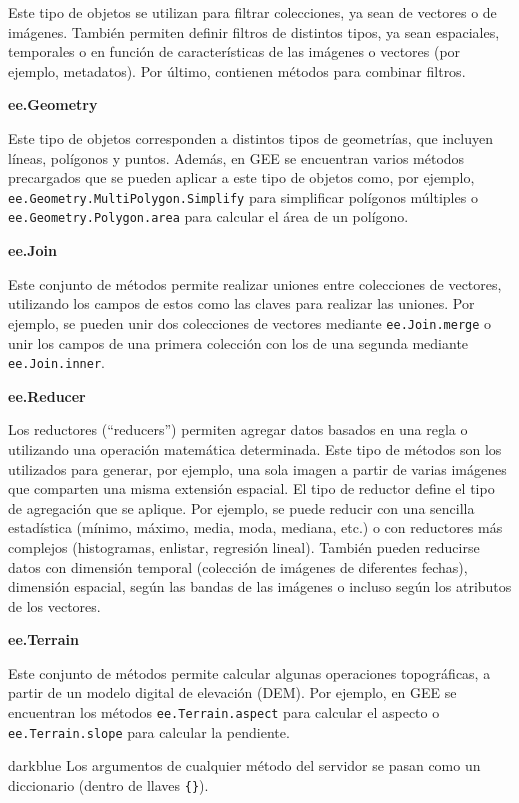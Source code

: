 \documentclass[
  12pt,
  letterpaper,
  twoside]{book}
\begin{document}
Este tipo de objetos se utilizan para filtrar colecciones, ya sean de vectores o de imágenes. También permiten definir filtros de distintos tipos, ya sean espaciales, temporales o en función de características de las imágenes o vectores (por ejemplo, metadatos). Por último, contienen métodos para combinar filtros.

\textbf{ee.Geometry}

Este tipo de objetos corresponden a distintos tipos de geometrías, que incluyen líneas, polígonos y puntos. Además, en GEE se encuentran varios métodos precargados que se pueden aplicar a este tipo de objetos como, por ejemplo, \texttt{ee.Geometry.MultiPolygon.Simplify} para simplificar polígonos múltiples o \texttt{ee.Geometry.Polygon.area} para calcular el área de un polígono.

\textbf{ee.Join}

Este conjunto de métodos permite realizar uniones entre colecciones de vectores, utilizando los campos de estos como las claves para realizar las uniones. Por ejemplo, se pueden unir dos colecciones de vectores mediante \texttt{ee.Join.merge} o unir los campos de una primera colección con los de una segunda mediante \texttt{ee.Join.inner}.

\textbf{ee.Reducer}

Los reductores (``reducers'') permiten agregar datos basados en una regla o utilizando una operación matemática determinada. Este tipo de métodos son los utilizados para generar, por ejemplo, una sola imagen a partir de varias imágenes que comparten una misma extensión espacial. El tipo de reductor define el tipo de agregación que se aplique. Por ejemplo, se puede reducir con una sencilla estadística (mínimo, máximo, media, moda, mediana, etc.) o con reductores más complejos (histogramas, enlistar, regresión lineal). También pueden reducirse datos con dimensión temporal (colección de imágenes de diferentes fechas), dimensión espacial, según las bandas de las imágenes o incluso según los atributos de los vectores.

\textbf{ee.Terrain}

Este conjunto de métodos permite calcular algunas operaciones topográficas, a partir de un modelo digital de elevación (DEM). Por ejemplo, en GEE se encuentran los métodos \texttt{ee.Terrain.aspect} para calcular el aspecto o \texttt{ee.Terrain.slope} para calcular la pendiente.

\begin{bluebox2}

\begin{awesomeblock}{5pt}{\faLightbulb}{darkblue}
Los argumentos de cualquier método del servidor se pasan como un diccionario (dentro de llaves \texttt{\{\}}).

\end{awesomeblock}

\end{bluebox2}
\end{document}

